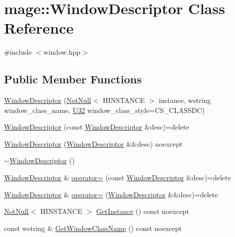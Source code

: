 \hypertarget{classmage_1_1_window_descriptor}{}\section{mage\+:\+:Window\+Descriptor Class Reference}
\label{classmage_1_1_window_descriptor}


{\ttfamily \#include $<$window.\+hpp$>$}

\subsection*{Public Member Functions}
\begin{DoxyCompactItemize}
\item 
\hyperlink{classmage_1_1_window_descriptor_af7a5263d567d320a2edd1420293d55e7}{Window\+Descriptor} (\hyperlink{namespacemage_a8769f9d670d6b585ea306cb1062af94b}{Not\+Null}$<$ H\+I\+N\+S\+T\+A\+N\+CE $>$ instance, wstring window\+\_\+class\+\_\+name, \hyperlink{namespacemage_a41c104c036fba3756a74e19f793eeaa1}{U32} window\+\_\+class\+\_\+style=C\+S\+\_\+\+C\+L\+A\+S\+S\+DC)
\item 
\hyperlink{classmage_1_1_window_descriptor_a98059ff14fd8c0e808d1a15dbf9b6bb8}{Window\+Descriptor} (const \hyperlink{classmage_1_1_window_descriptor}{Window\+Descriptor} \&desc)=delete
\item 
\hyperlink{classmage_1_1_window_descriptor_a9c63bbf4c794efd0e6dbc067d3378ccd}{Window\+Descriptor} (\hyperlink{classmage_1_1_window_descriptor}{Window\+Descriptor} \&\&desc) noexcept
\item 
\hyperlink{classmage_1_1_window_descriptor_ac73160dd1e90b9acf819164b774d5709}{$\sim$\+Window\+Descriptor} ()
\item 
\hyperlink{classmage_1_1_window_descriptor}{Window\+Descriptor} \& \hyperlink{classmage_1_1_window_descriptor_a539433423c905e8b45d5bc9d895ee79c}{operator=} (const \hyperlink{classmage_1_1_window_descriptor}{Window\+Descriptor} \&desc)=delete
\item 
\hyperlink{classmage_1_1_window_descriptor}{Window\+Descriptor} \& \hyperlink{classmage_1_1_window_descriptor_a314e45a7cac3a68caefd8b05ddc86040}{operator=} (\hyperlink{classmage_1_1_window_descriptor}{Window\+Descriptor} \&\&desc)=delete
\item 
\hyperlink{namespacemage_a8769f9d670d6b585ea306cb1062af94b}{Not\+Null}$<$ H\+I\+N\+S\+T\+A\+N\+CE $>$ \hyperlink{classmage_1_1_window_descriptor_a09423845e3cc6bd451e280a92222ca14}{Get\+Instance} () const noexcept
\item 
const wstring \& \hyperlink{classmage_1_1_window_descriptor_a28e28c6aca97423689066d0f642e3561}{Get\+Window\+Class\+Name} () const noexcept
\end{DoxyCompactItemize}
